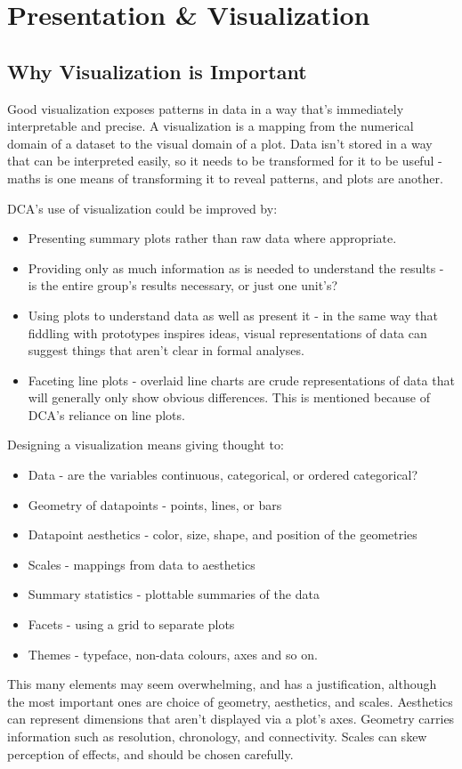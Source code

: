 \documentclass[11pt,a4paper,article]{memoir} %
\begin{document}
\section{Presentation \& Visualization}
\subsection{Why Visualization is Important}
Good visualization exposes patterns in data in a way that's immediately interpretable and precise. A visualization is a mapping from the numerical domain of a dataset to the visual domain of a plot. Data isn't stored in a way that can be interpreted easily, so it needs to be transformed for it to be useful - maths is one means of transforming it to reveal patterns, and plots are another.

DCA's use of visualization could be improved by:
\begin{itemize}
\item Presenting summary plots rather than raw data where appropriate.
\item Providing only as much information as is needed to understand the results - is the entire group's results necessary, or just one unit's?
\item Using plots to understand data as well as present it - in the same way that fiddling with prototypes inspires ideas, visual representations of data can suggest things that aren't clear in formal analyses.
\item Faceting line plots - overlaid line charts are crude representations of data that will generally only show obvious differences. This is mentioned because of DCA's reliance on line plots.
\end{itemize}
Designing a visualization means giving thought to:
\begin{itemize}
\item Data - are the variables continuous, categorical, or ordered categorical?
\item Geometry of datapoints - points, lines, or bars
\item Datapoint aesthetics - color, size, shape, and position of the geometries
\item Scales - mappings from data to aesthetics
\item Summary statistics - plottable summaries of the data
\item Facets - using a grid to separate plots
\item Themes - typeface, non-data colours, axes and so on.
\end{itemize}
This many elements may seem overwhelming, and has a justification, although the most important ones are choice of geometry, aesthetics, and scales. Aesthetics can represent dimensions that aren't displayed via a plot's axes. Geometry carries information such as resolution, chronology,  and connectivity. Scales can skew perception of effects, and should be chosen carefully.
\end{document}
